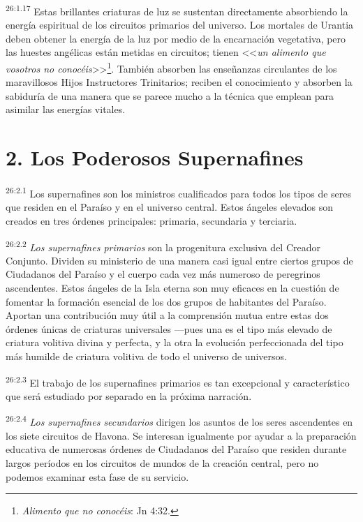 \par
\textsuperscript{26:1.17} Estas brillantes criaturas de luz se sustentan directamente absorbiendo la energía espiritual de los circuitos primarios del universo. Los mortales de Urantia deben obtener la energía de la luz por medio de la encarnación vegetativa, pero las huestes angélicas están metidas en circuitos; tienen <<\textit{un alimento que vosotros no conocéis}>>\footnote{\textit{Alimento que no conocéis}: Jn 4:32.}. También absorben las enseñanzas circulantes de los maravillosos Hijos Instructores Trinitarios; reciben el conocimiento y absorben la sabiduría de una manera que se parece mucho a la técnica que emplean para asimilar las energías vitales.

\section*{2. Los Poderosos Supernafines}
\par
\textsuperscript{26:2.1} Los supernafines son los ministros cualificados para todos los tipos de seres que residen en el Paraíso y en el universo central. Estos ángeles elevados son creados en tres órdenes principales: primaria, secundaria y terciaria.

\par
\textsuperscript{26:2.2} \textit{Los supernafines primarios} son la progenitura exclusiva del Creador Conjunto. Dividen su ministerio de una manera casi igual entre ciertos grupos de Ciudadanos del Paraíso y el cuerpo cada vez más numeroso de peregrinos ascendentes. Estos ángeles de la Isla eterna son muy eficaces en la cuestión de fomentar la formación esencial de los dos grupos de habitantes del Paraíso. Aportan una contribución muy útil a la comprensión mutua entre estas dos órdenes únicas de criaturas universales ---pues una es el tipo más elevado de criatura volitiva divina y perfecta, y la otra la evolución perfeccionada del tipo más humilde de criatura volitiva de todo el universo de universos.

\par
\textsuperscript{26:2.3} El trabajo de los supernafines primarios es tan excepcional y característico que será estudiado por separado en la próxima narración.

\par
\textsuperscript{26:2.4} \textit{Los supernafines secundarios} dirigen los asuntos de los seres ascendentes en los siete circuitos de Havona. Se interesan igualmente por ayudar a la preparación educativa de numerosas órdenes de Ciudadanos del Paraíso que residen durante largos períodos en los circuitos de mundos de la creación central, pero no podemos examinar esta fase de su servicio.

